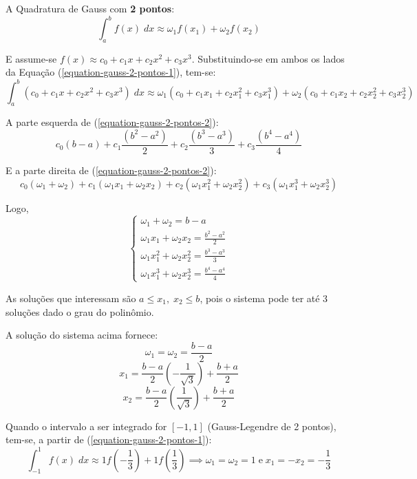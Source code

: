 A Quadratura de Gauss com \textbf{2 pontos}:
\begin{equation}
	\label{equation-gauss-2-pontos-1}
	\int_{a}^b f(x)\;dx \approx \omega_1f(x_1)+\omega_2f(x_2)
\end{equation}

E assume-se $f(x)\approx c_0+c_1x+c_2x^2+c_3x^3$. Substituindo-se em ambos os lados da Equação (\ref{equation-gauss-2-pontos-1}), tem-se:
\begin{equation}
	\label{equation-gauss-2-pontos-2}
	\int_{a}^b (c_0+c_1x+c_2x^2+c_3x^3)\;dx \approx \omega_1(c_0+c_1x_1+c_2x_1^2+c_3x_1^3)+\omega_2(c_0+c_1x_2+c_2x_2^2+c_3x_2^3)
\end{equation}

A parte esquerda de (\ref{equation-gauss-2-pontos-2}):
\[ c_0(b-a)+c_1\frac{(b^2-a^2)}{2}+c_2\frac{(b^3-a^3)}{3}+c_3\frac{(b^4-a^4)}{4} \]

E a parte direita de (\ref{equation-gauss-2-pontos-2}):
\[ c_0(\omega_1+\omega_2)+c_1(\omega_1x_1+\omega_2x_2)+c_2(\omega_1x_1^2+\omega_2x_2^2)+c_3(\omega_1x_1^3+\omega_2x_2^3) \]

Logo,
\[
\begin{cases}
	\omega_1+\omega_2=b-a \\
	\omega_1x_1+\omega_2x_2=\frac{b^2-a^2}{2} \\
	\omega_1x_1^2+\omega_2x_2^2=\frac{b^3-a^3}{3} \\
	\omega_1x_1^3+\omega_2x_2^3=\frac{b^4-a^4}{4}
\end{cases}
\]

As soluções que interessam são $a\leqslant x_1,\;x_2\leqslant b$, pois o sistema pode ter até 3 soluções dado o grau do polinômio.

A solução do sistema acima fornece:
\[ \omega_1=\omega_2=\frac{b-a}{2} \]
\[ x_1=\frac{b-a}{2} \left(-\frac{1}{\sqrt{3}}\right)+\frac{b+a}{2} \]
\[ x_2=\frac{b-a}{2} \left(\frac{1}{\sqrt{3}}\right)+\frac{b+a}{2} \]

Quando o intervalo a ser integrado for $[-1,1]$ (Gauss-Legendre de 2 pontos), tem-se, a partir de (\ref{equation-gauss-2-pontos-1}):
\[ \int_{-1}^1f(x)\;dx\approx1f\left(-\frac{1}{3}\right)+1f\left(\frac{1}{3}\right) \implies \omega_1=\omega_2=1 \;\text{e}\; x_1=-x_2=-\frac{1}{3} \]